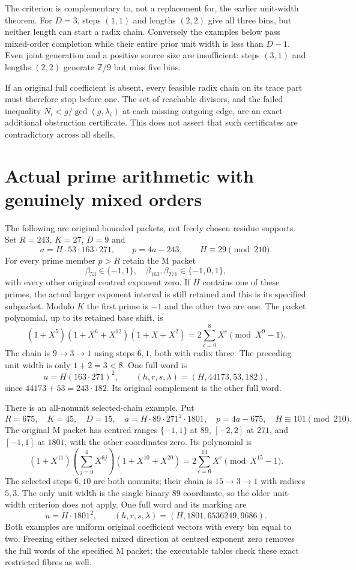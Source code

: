 The criterion is complementary to, not a replacement for, the earlier
unit-width theorem. For $D=3$, steps $(1,1)$ and lengths $(2,2)$ give all three
bins, but neither length can start a radix chain. Conversely the examples
below pass mixed-order completion while their entire prior unit width is less
than $D-1$. Even joint generation and a positive source size are insufficient:
steps $(3,1)$ and lengths $(2,2)$ generate $\mathbb Z/9$ but miss five bins.

If an original full coefficient is absent, every feasible radix chain on its
trace part must therefore stop before one. The set of reachable divisors, and
the failed inequality $N_i<g/\gcd(g,\lambda_i)$ at each missing outgoing edge,
are an exact additional obstruction certificate. This does not assert that
such certificates are contradictory across all shells.

\section{Actual prime arithmetic with genuinely mixed orders}
The following are original bounded packets, not freely chosen residue supports.
Set $R=243$, $K=27$, $D=9$ and
\[
 a=H\cdot53\cdot163\cdot271,
 \qquad p=4a-243,
 \qquad H\equiv29\pmod{210}.
\]
For every prime member $p>R$ retain the M packet
\[
 \beta_{53}\in\{-1,1\},\quad
 \beta_{163},\beta_{271}\in\{-1,0,1\},
\]
with every other original centred exponent zero. If $H$ contains one of
these primes, the actual larger exponent interval is still retained and this
is its specified subpacket. Modulo $K$ the first prime is $-1$ and the other
two are one. The packet polynomial, up to its retained base shift, is
\[
 (1+X^5)(1+X^6+X^{12})(1+X+X^2)
 =2\sum_{c=0}^8X^c\pmod{X^9-1}.
\]
The chain is $9\to3\to1$ using steps $6,1$, both with radix three.
The preceding unit width is only $1+2=3<8$.
One full word is
\[
 u=H(163\cdot271)^2,\qquad
 (h,r,s,\lambda)=(H,44173,53,182),
\]
since $44173+53=243\cdot182$. Its original complement is the other full word.

There is an all-nonunit selected-chain example. Put
\[
 R=675,\quad K=45,\quad D=15,\quad
 a=H\cdot89\cdot271^2\cdot1801,\quad p=4a-675,
 \quad H\equiv101\pmod{210}.
\]
The original M packet has centred ranges $\{-1,1\}$ at $89$,
$[-2,2]$ at $271$, and $[-1,1]$ at $1801$, with the other coordinates zero.
Its polynomial is
\[
 (1+X^{11})\left(\sum_{j=0}^4X^{6j}\right)(1+X^{10}+X^{20})
 =2\sum_{c=0}^{14}X^c\pmod{X^{15}-1}.
\]
The selected steps $6,10$ are both nonunits; their chain is
$15\to3\to1$ with radices $5,3$. The only unit width is the single binary
$89$ coordinate, so the older unit-width criterion does not apply.
One full word and its marking are
\[
 u=H\cdot1801^2,\qquad
 (h,r,s,\lambda)=(H,1801,6536249,9686).
\]
Both examples are uniform original coefficient vectors with every bin equal
to two. Freezing either selected mixed direction at centred exponent zero
removes the full words of the specified M packet; the executable tables check
these exact restricted fibres as well.

